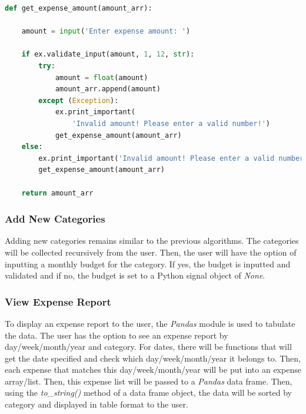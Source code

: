 \documentclass[12pt]{article}
\begin{document}
  \begin{lstlisting}[language=Python, caption=Source code for \textit{get\_expense\_amount()}, captionpos=b]
  def get_expense_amount(amount_arr):
    
    amount = input('Enter expense amount: ')

    if ex.validate_input(amount, 1, 12, str):
        try:
            amount = float(amount)
            amount_arr.append(amount)
        except (Exception):
            ex.print_important(
                'Invalid amount! Please enter a valid number!')
            get_expense_amount(amount_arr)
    else:
        ex.print_important('Invalid amount! Please enter a valid number!')
        get_expense_amount(amount_arr)

    return amount_arr
  \end{lstlisting}

  \subsubsection{Add New Categories}
  Adding new categories remains similar to the previous algorithms. The categories will be collected recursively from the user. Then, the user will have the option of inputting a monthly budget for the category. If yes, the budget is inputted and validated and if no, the budget is set to a Python signal object of \textit{None}.

  \subsubsection{View Expense Report}
  To display an expense report to the user, the \textit{Pandas} module is used to tabulate the data.
  The user has the option to see an expense report by day/week/month/year and category. For dates, there will be functions that will get the date specified and check which day/week/month/year it belongs to. Then, each expense that matches this day/week/month/year will be put into an expense array/list. Then, this expense list will be passed to a \textit{Pandas} data frame. Then, using the \textit{to\_string()} method of a data frame object, the data will be sorted by category and displayed in table format to the user.
\end{document}
